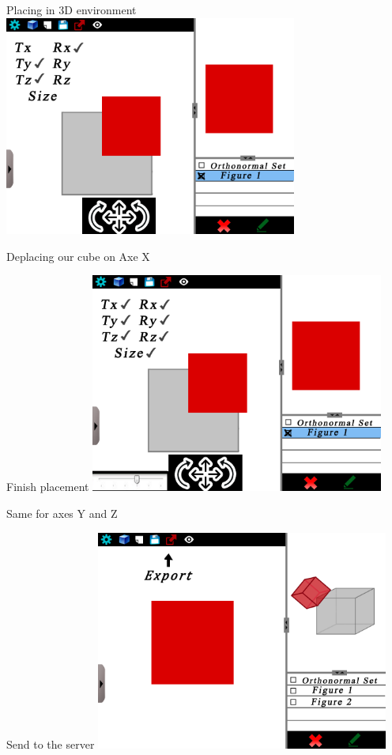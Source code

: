 \documentclass[a4paper,10pt]{beamer}
\begin{document}
			\begin{frame}{Placing in 3D environment}
				\includegraphics[height=205pt]{maquette/maquette_6.png}
				
				Deplacing our cube on Axe X
			\end{frame}
			
			\begin{frame}{Finish placement}
				\includegraphics[height=205pt]{maquette/maquette_7.png}
				
				Same for axes Y and Z
			\end{frame}
			
			\begin{frame}{Send to the server}
				\includegraphics[height=205pt]{maquette/maquette_8.png}
			\end{frame}
			
\end{document}

